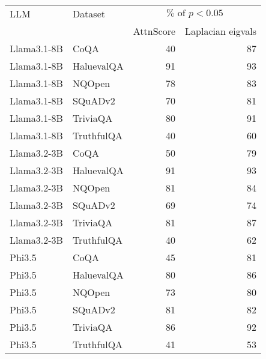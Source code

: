 \begin{tabular}{llrr}
\toprule
LLM & Dataset & \multicolumn{2}{c}{$\% \text{ of } p < 0.05$} \\
\cmidrule(lr){3-4}
& & AttnScore & Laplacian eigvals \\
\midrule
Llama3.1-8B & CoQA & 40 & 87 \\
Llama3.1-8B & HaluevalQA & 91 & 93 \\
Llama3.1-8B & NQOpen & 78 & 83 \\
Llama3.1-8B & SQuADv2 & 70 & 81 \\
Llama3.1-8B & TriviaQA & 80 & 91 \\
Llama3.1-8B & TruthfulQA & 40 & 60 \\
\midrule
Llama3.2-3B & CoQA & 50 & 79 \\
Llama3.2-3B & HaluevalQA & 91 & 93 \\
Llama3.2-3B & NQOpen & 81 & 84 \\
Llama3.2-3B & SQuADv2 & 69 & 74 \\
Llama3.2-3B & TriviaQA & 81 & 87 \\
Llama3.2-3B & TruthfulQA & 40 & 62 \\
\midrule
Phi3.5 & CoQA & 45 & 81 \\
Phi3.5 & HaluevalQA & 80 & 86 \\
Phi3.5 & NQOpen & 73 & 80 \\
Phi3.5 & SQuADv2 & 81 & 82 \\
Phi3.5 & TriviaQA & 86 & 92 \\
Phi3.5 & TruthfulQA & 41 & 53 \\
\bottomrule
\end{tabular}